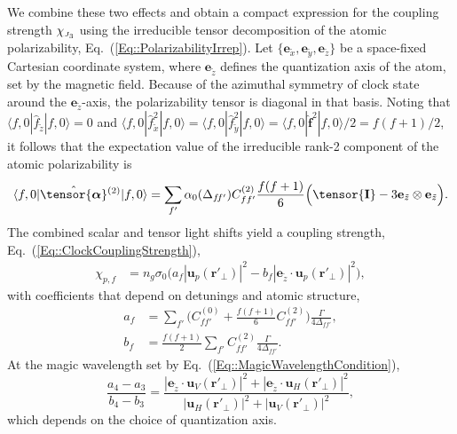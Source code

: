 \documentclass[preprint, aps,pra,onecolumn]{revtex4-1} %
\def\br{\mathbf{r}}
\newcommand{\erf}[1]{Eq.~(\ref{#1})}
\newcommand{\unittens}{\tensor{\mathbf{I}}}
\newcommand{\poltens}{\hat{\tensor{\boldsymbol{\alpha}}}}
\newcommand{\charpol}{\alpha_0(\Delta_{f\!f'})}
\newcommand{\qaxis}{\mathbf{e}_{\tilde{z}}}
\newcommand{\chieff}{\chi_{\raisebox{-.1pt}{\tiny $J_3$}}}
\begin{document}
We combine these two effects and obtain a compact expression for the coupling strength $\chieff$ using the irreducible tensor decomposition of the atomic polarizability, \erf{Eq::PolarizabilityIrrep}.  
Let $\{\mathbf{e}_{\tilde{x}},\mathbf{e}_{\tilde{y}}, \mathbf{e}_{\tilde{z}}\}$ be a space-fixed Cartesian coordinate system, where $\mathbf{e}_{\tilde{z}}$ defines the quantization axis of the atom, set by the magnetic field.  Because of the azimuthal symmetry of clock state around the $\qaxis$-axis, the polarizability tensor is diagonal in that basis.  
Noting that $\langle f,0 | \hat{f}_{\tilde{z}}| f,0 \rangle =0$ and $\langle f,0 | \hat{f}_{\tilde{x}}^2| f,0 \rangle = \langle f,0 | \hat{f}_{\tilde{y}}^2| f,0 \rangle = \langle f,0 | \hat{\mathbf{f}}^2| f,0 \rangle /2 =f(f+1)/2$, it follows that the expectation value of the irreducible rank-2 component of the atomic polarizability is
	\begin{align} \label{Eq::CouplingAngleMagic}
		\langle f,0 | \poltens \phantom{}^{(2)}| f,0 \rangle = \sum_{f'} \charpol C^{(2)}_{ff'} \frac{f(f+1)}{6} \Big( \unittens - 3\qaxis \otimes \qaxis \Big).
	\end{align}
The combined scalar and tensor light shifts yield a coupling strength, \erf{Eq::ClockCouplingStrength},
	\begin{align}
		\chi_{p,f} &  = n_g \sigma_0 \big(  a_{f} \left|\mathbf{u}_p(\br'_\perp)\right|^2 - b_{f} \left|\mathbf{e}_{\tilde{z}} \cdot \mathbf{u}_p(\br'_\perp)\right|^2 \big), \label{Eq::ClockStateCoupling}
	\end{align}
with coefficients that depend on detunings and atomic structure,
	\begin{align}
		a_f &= \sum_{f'}  \Big(C^{(0)}_{ff'} + \frac{f(f+1)}{6} C^{(2)}_{ff'} \Big) \frac{\Gamma}{4 \Delta_{ff'}},\\
		b_f &= \frac{f(f+1)}{2}\sum_{f'} C^{(2)}_{ff'}  \frac{\Gamma}{4 \Delta_{ff'}}.
	\end{align}
At the magic wavelength set by \erf{Eq::MagicWavelengthCondition},
\begin{equation}
	\frac{a_4-a_3}{b_4-b_3} =  \frac{ |\mathbf{e}_{\tilde{z}} \cdot \mathbf{u}_V(\br'_\perp)|^2  + |\mathbf{e}_{\tilde{z}} \cdot \mathbf{u}_H(\br'_\perp) |^2 }{ |\mathbf{u}_H(\br'_\perp)|^2 + |\mathbf{u}_V(\br'_\perp)|^2 },
\end{equation}
which depends on the choice of quantization axis.
\end{document}
